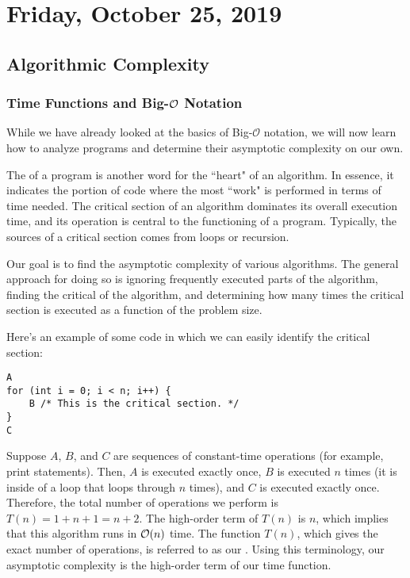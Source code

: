\section{Friday, October 25, 2019}

\subsection{Algorithmic Complexity}

\subsubsection{Time Functions and Big-$\mathcal{O}$ Notation}
While we have already looked at the basics of Big-$\mathcal{O}$ notation, we will now learn how to analyze programs and determine their asymptotic complexity on our own. 

The  of a program is another word for the ``heart" of an algorithm. In essence, it indicates the portion of code where the most ``work" is performed in terms of time needed. The critical section of an algorithm dominates its overall execution time, and its operation is central to the functioning of a program. Typically, the sources of a critical section comes from loops or recursion.

Our goal is to find the asymptotic complexity of various algorithms. The general approach for doing so is ignoring frequently executed parts of the algorithm, finding the critical of the algorithm, and determining how many times the critical section is executed as a function of the problem size. 


Here's an example of some code in which we can easily identify the critical section:

\begin{lstlisting}
A
for (int i = 0; i < n; i++) {
    B /* This is the critical section. */
}
C
\end{lstlisting}

Suppose $A$, $B$, and $C$ are sequences of constant-time operations (for example, print statements). Then, $A$ is executed exactly once, $B$ is executed $n$ times (it is inside of a loop that loops through $n$ times), and $C$ is executed exactly once. Therefore, the total number of operations we perform is $T(n) = 1 + n + 1 = n + 2$. The high-order term of $T(n)$ is $n$, which implies that this algorithm runs in $\mathcal{O}(n)$ time. The function $T(n)$, which gives the exact number of operations, is referred to as our . Using this terminology, our asymptotic complexity is the high-order term of our time function. \\

